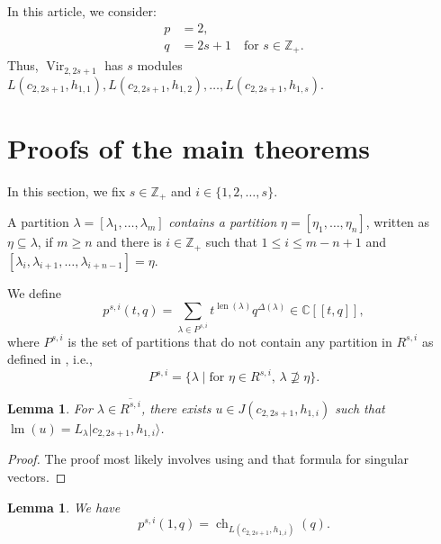 \documentclass[a4paper, 12pt, reqno]{amsart}
\newtheorem{lemma}[theorem]{Lemma}
\theoremstyle{remark}
\DeclareMathOperator{\Vir}{Vir}
\DeclareMathOperator{\ch}{ch}
\DeclareMathOperator{\len}{len}
\DeclareMathOperator{\lm}{lm}
\begin{document}
In this article, we consider:
\begin{align*}
  p &= 2, \\
  q &= 2s + 1 \quad \text{for $s \in \mathbb{Z}_+$}.
\end{align*}
Thus, $\Vir_{2, 2s + 1}$ has $s$ modules $L(c_{2, 2s + 1}, h_{1, 1}), L(c_{2, 2s + 1}, h_{1, 2}), \dots, L(c_{2, 2s + 1}, h_{1, s})$.

\section{Proofs of the main theorems}
\label{sec:proofs-main-theorems}

In this section, we fix $s \in \mathbb{Z}_+$ and $i \in \{1, 2, \dots, s\}$.

A partition $\lambda = [\lambda_1, \dots, \lambda_m]$ \emph{contains a partition} $\eta = [\eta_1, \dots, \eta_n]$, written as $\eta \subseteq \lambda$, if $m \ge n$ and there is $i \in \mathbb{Z}_+$ such that $1 \le i \le m - n + 1$ and $[\lambda_i, \lambda_{i + 1}, \dots, \lambda_{i + n - 1}] = \eta$.

We define
\begin{equation*}
  p^{s, i}(t, q) = \sum_{\lambda \in P^{s, i}}t^{\len(\lambda)}q^{\Delta(\lambda)} \in \mathbb{C}[[t, q]],
\end{equation*}
where $P^{s, i}$ is the set of partitions that do not contain any partition in $R^{s, i}$ as defined in , i.e.,
\begin{equation*}
  P^{s, i} = \{\lambda \mid \text{for $\eta \in R^{s, i}$, $\lambda \nsupseteq \eta$}\}.
\end{equation*}

\begin{lemma}
  \label{lmm:3}
  For $\lambda \in \overline{R^{s, i}}$, there exists $u \in J(c_{2, 2s + 1}, h_{1, i})$ such that $\lm(u) = L_{\lambda}|c_{2, 2s + 1}, h_{1, i}\rangle$.
\end{lemma}

\begin{proof}
  The proof most likely involves using  and that formula for singular vectors.
\end{proof}

\begin{lemma}
  \label{lmm:4}
  We have
  \begin{equation*}
    p^{s, i}(1, q) = \ch_{L(c_{2, 2s + 1}, h_{1, i})}(q).
  \end{equation*}
\end{lemma}
\end{document}
